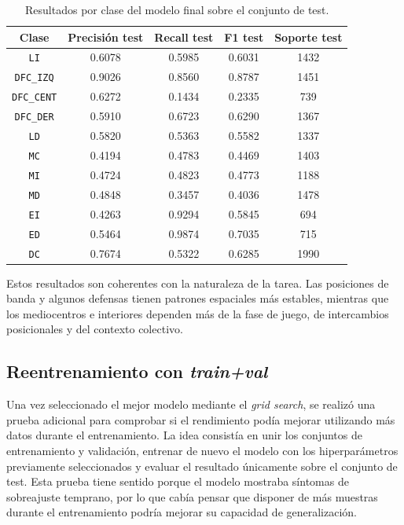 \begin{table}[H]
\centering
\scriptsize
\begin{tabular}{c|c|c|c|c}
\textbf{Clase} & \textbf{Precisión test} & \textbf{Recall test} & \textbf{F1 test} & \textbf{Soporte test} \\
\hline\hline
\texttt{LI} & 0.6078 & 0.5985 & 0.6031 & 1432 \\
\hline
\texttt{DFC\_IZQ} & 0.9026 & 0.8560 & 0.8787 & 1451 \\
\hline
\texttt{DFC\_CENT} & 0.6272 & 0.1434 & 0.2335 & 739 \\
\hline
\texttt{DFC\_DER} & 0.5910 & 0.6723 & 0.6290 & 1367 \\
\hline
\texttt{LD} & 0.5820 & 0.5363 & 0.5582 & 1337 \\
\hline
\texttt{MC} & 0.4194 & 0.4783 & 0.4469 & 1403 \\
\hline
\texttt{MI} & 0.4724 & 0.4823 & 0.4773 & 1188 \\
\hline
\texttt{MD} & 0.4848 & 0.3457 & 0.4036 & 1478 \\
\hline
\texttt{EI} & 0.4263 & 0.9294 & 0.5845 & 694 \\
\hline
\texttt{ED} & 0.5464 & 0.9874 & 0.7035 & 715 \\
\hline
\texttt{DC} & 0.7674 & 0.5322 & 0.6285 & 1990 \\
\hline
\end{tabular}
\caption{Resultados por clase del modelo final sobre el conjunto de test.}
\label{tab:set_transformer_test_by_class}
\end{table}

Estos resultados son coherentes con la naturaleza de la tarea. Las posiciones de banda y algunos defensas tienen patrones espaciales más estables, mientras que los mediocentros e interiores dependen más de la fase de juego, de intercambios posicionales y del contexto colectivo.

\subsection{Reentrenamiento con \textit{train+val}}

Una vez seleccionado el mejor modelo mediante el \textit{grid search}, se realizó una prueba adicional para comprobar si el rendimiento podía mejorar utilizando más datos durante el entrenamiento. La idea consistía en unir los conjuntos de entrenamiento y validación, entrenar de nuevo el modelo con los hiperparámetros previamente seleccionados y evaluar el resultado únicamente sobre el conjunto de test. Esta prueba tiene sentido porque el modelo mostraba síntomas de sobreajuste temprano, por lo que cabía pensar que disponer de más muestras durante el entrenamiento podría mejorar su capacidad de generalización.

